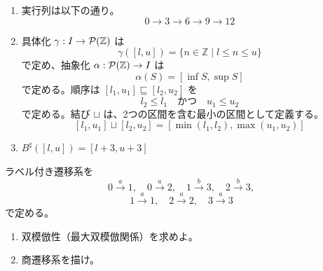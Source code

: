 \documentclass[
		head_space=20mm,
		foot_space=20mm,
		gutter=10mm,
		line_length=190mm
]{jlreq}
\begin{document}
\begin{answer}
	\begin{enumerate}
		\item 実行列は以下の通り。\[0 \to 3 \to 6 \to 9 \to 12\]
		\item 具体化 $\gamma:I\to \mathcal P(\mathbb{Z})$ は \[\gamma([l,u])=\{n\in\mathbb Z\mid l\leq n\leq u\}\] で定め、抽象化 $\alpha:\mathcal P(\mathbb{Z})\to I$ は \[\alpha(S)=[\inf S,\sup S]\] で定める。順序は $[l_1,u_1]\sqsubseteq[l_2,u_2]$ を \[l_2\le l_1 \quad\text{かつ}\quad u_1\le u_2\] で定める。結び $\sqcup$ は、2つの区間を含む最小の区間として定義する。\[[l_1,u_1]\sqcup[l_2,u_2] = [\min(l_1,l_2),\max(u_1,u_2)]\]
		\item $B^\sharp([l,u])=[l+3,u+3]$
	\end{enumerate}
\end{answer}


\clearpage

\begin{practice}[双模倣]
	ラベル付き遷移系を \[0\xrightarrow{~a~}1,\quad 0\xrightarrow{~a~}2,\quad 1\xrightarrow{~b~}3,\quad 2\xrightarrow{~b~}3,\] 
	\[1\xrightarrow{~a~}1,\quad 2\xrightarrow{~a~}2,\quad 3\xrightarrow{~a~}3\] 
	で定める。
	\begin{enumerate}
		\item 双模倣性（最大双模倣関係）を求めよ。
		\item 商遷移系を描け。
	\end{enumerate}
\end{practice}
\end{document}
